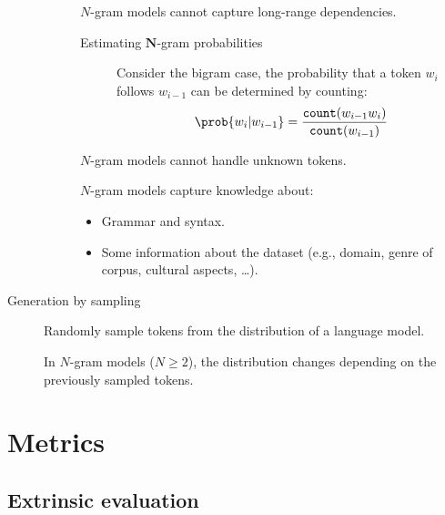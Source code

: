 \begin{description}
\begin{description}
                \begin{remark}
                    $N$-gram models cannot capture long-range dependencies.
                \end{remark}

                \begin{description}
                    \item[Estimating $\mathbf{N}$-gram probabilities]
                        Consider the bigram case, the probability that a token $w_i$ follows $w_{i-1}$ can be determined by counting:
                        \[ \prob{w_i | w_{i-1}} = \frac{\texttt{count}(w_{i-1} w_i)}{\texttt{count}(w_{i-1})} \]
                \end{description}

                \begin{remark}
                    $N$-gram models cannot handle unknown tokens.
                \end{remark}

                \begin{remark}
                    $N$-gram models capture knowledge about:
                    \begin{itemize}
                        \item Grammar and syntax.
                        \item Some information about the dataset (e.g., domain, genre of corpus, cultural aspects, \dots).
                    \end{itemize}
                \end{remark}
        \end{description}

    \item[Generation by sampling] 
        Randomly sample tokens from the distribution of a language model.

        \begin{remark}
            In $N$-gram models ($N \geq 2$), the distribution changes depending on the previously sampled tokens.
        \end{remark}
\end{description}



\section{Metrics}


\subsection{Extrinsic evaluation}

